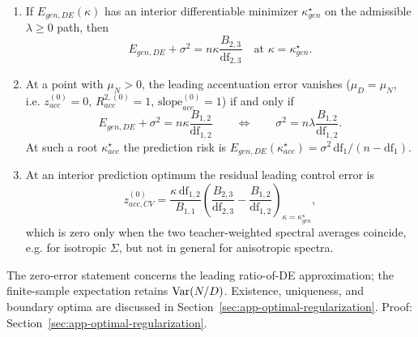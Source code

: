 \begin{prop}
\label{prop:mr-pixel-tuning}
\leavevmode
\begin{enumerate}
\item If $E_{gen,DE}(\kappa)$ has an interior differentiable minimizer
$\kappa^\star_{gen}$ on the admissible $\lambda\ge0$ path, then
\begin{equation}
E_{gen,DE}+\sigma^2=n\kappa\frac{B_{2,3}}{\mathrm{df}_{2,3}}
\quad\text{at }\kappa=\kappa^\star_{gen}.
\label{eq:mr-pred-optimal}
\end{equation}
\item At a point with $\mu_N>0$, the leading accentuation error vanishes
($\mu_D=\mu_N$, i.e. $z^{(0)}_{acc}=0$, $R^{2,(0)}_{acc}=1$,
$\mathrm{slope}^{(0)}_{acc}=1$) if and only if
\begin{equation}
E_{gen,DE}+\sigma^2=n\kappa\frac{B_{1,2}}{\mathrm{df}_{1,2}}
\qquad\Longleftrightarrow\qquad
\sigma^2=n\lambda\frac{B_{1,2}}{\mathrm{df}_{1,2}} .
\label{eq:mr-control-optimal}
\end{equation}
At such a root $\kappa^\star_{acc}$ the prediction risk is
$E_{gen,DE}(\kappa^\star_{acc})=\sigma^2\,\mathrm{df}_1/(n-\mathrm{df}_1)$.
\item At an interior prediction optimum the residual leading control error is
\begin{equation}
z^{(0)}_{acc,CV}
=\frac{\kappa\,\mathrm{df}_{1,2}}{B_{1,1}}
\left(\frac{B_{2,3}}{\mathrm{df}_{2,3}}-\frac{B_{1,2}}{\mathrm{df}_{1,2}}\right)_{\kappa=\kappa^\star_{gen}},
\label{eq:mr-zacc-cv}
\end{equation}
which is zero only when the two teacher-weighted spectral averages coincide,
e.g. for isotropic $\Sigma$, but not in general for anisotropic spectra.
\end{enumerate}
The zero-error statement concerns the leading ratio-of-DE approximation; the
finite-sample expectation retains $\mathrm{Var}(N/D)$.  Existence, uniqueness, and
boundary optima are discussed in Section~\ref{sec:app-optimal-regularization}.
Proof: Section~\ref{sec:app-optimal-regularization}.
\end{prop}

